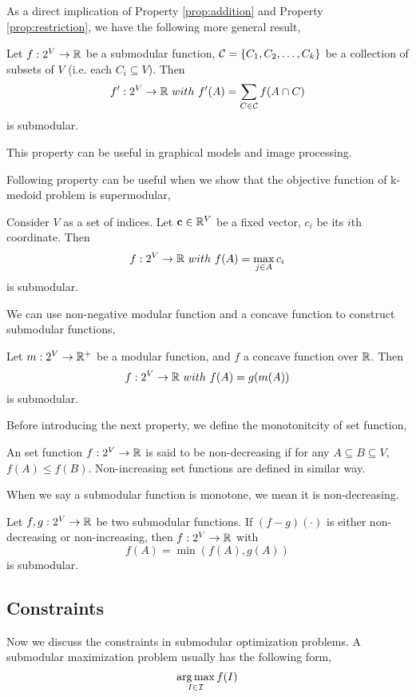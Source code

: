 As a direct implication of Property \ref{prop:addition} and Property \ref{prop:restriction}, we have the following more general result,
\begin{property}
Let $f:2^V \rightarrow \mathbb{R}$ be a submodular function, $\mathcal{C} = \{C_1, C_2, \ldots, C_k\}$ be a collection of subsets of $V$ (i.e. each $C_i \subseteq V$). Then
$$f':2^V \rightarrow \mathbb{R}~{with}~f'(A) = \sum_{C\in\mathcal{C}}f(A\cap C)$$ 
is submodular.
\end{property}
This property can be useful in graphical models and image processing. 


Following property can be useful when we show that the objective function of k-medoid problem is supermodular,
\begin{property}
  \label{prop:max}
Consider $V$ as a set of indices. Let $\mathbf{c}\in \mathbb{R}^V$ be a fixed vector, $c_i$ be its $i$th coordinate. Then 
$$f:2^V \rightarrow \mathbb{R}~{with}~ f(A) = \max_{j\in A}c_i$$ 
is submodular.
\end{property}

We can use non-negative modular function and a concave function to construct submodular functions,
\begin{property}
  Let $m: 2^V \rightarrow \mathbb{R}^+$ be a modular function, and $f$ a concave function over $\mathbb{R}$. Then
$$f: 2^V \rightarrow \mathbb{R} ~{with}~ f(A) = g(m(A))$$
is submodular.
\end{property}

Before introducing the next property, we define the monotonitcity of set function,
\begin{definition}[Monotonitcity]
  An set function $f: 2^V \rightarrow  \mathbb{R}$ is said to be non-decreasing if for any $A\subseteq B \subseteq V$, $f(A) \leq f(B)$. Non-increasing set functions are defined in similar way.
\end{definition}
When we say a submodular function is monotone, we mean it is non-decreasing.

\begin{property}
  Let $f, g: 2^V \rightarrow \mathbb{R}$ be two submodular functions. If $(f - g)(\cdot)$ is either non-decreasing or non-increasing, then $f: 2^V \rightarrow \mathbb{R}$ with
$$f(A) = \min(f(A), g(A))$$
is submodular.
\end{property}



\subsection{Constraints}
Now we discuss the constraints in submodular optimization problems. A submodular maximization problem usually has the following form,
\begin{equation}
  \label{eq:optimization}
  \operatorname*{arg\,max}_{I\in\mathcal{I}} f(I)
\end{equation}

